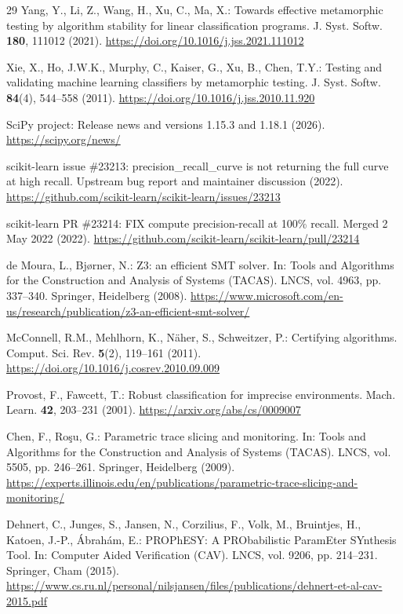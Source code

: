 \documentclass[11pt,a4paper]{article}
\theoremstyle{plain}
\theoremstyle{definition}
\theoremstyle{remark}
\begin{document}
\begin{thebibliography}{29}
Yang, Y., Li, Z., Wang, H., Xu, C., Ma, X.: Towards effective metamorphic testing by algorithm stability for linear classification programs. J. Syst. Softw. \textbf{180}, 111012 (2021). \url{https://doi.org/10.1016/j.jss.2021.111012}

Xie, X., Ho, J.W.K., Murphy, C., Kaiser, G., Xu, B., Chen, T.Y.: Testing and validating machine learning classifiers by metamorphic testing. J. Syst. Softw. \textbf{84}(4), 544--558 (2011). \url{https://doi.org/10.1016/j.jss.2010.11.920}

SciPy project: Release news and versions 1.15.3 and 1.18.1 (2026). \url{https://scipy.org/news/}

scikit-learn issue \#23213: precision\_recall\_curve is not returning the full curve at high recall. Upstream bug report and maintainer discussion (2022). \url{https://github.com/scikit-learn/scikit-learn/issues/23213}

scikit-learn PR \#23214: FIX compute precision-recall at 100\% recall. Merged 2 May 2022 (2022). \url{https://github.com/scikit-learn/scikit-learn/pull/23214}

de Moura, L., Bj{\o}rner, N.: Z3: an efficient SMT solver. In: Tools and Algorithms for the Construction and Analysis of Systems (TACAS). LNCS, vol. 4963, pp. 337--340. Springer, Heidelberg (2008). \url{https://www.microsoft.com/en-us/research/publication/z3-an-efficient-smt-solver/}

McConnell, R.M., Mehlhorn, K., N\"{a}her, S., Schweitzer, P.: Certifying algorithms. Comput. Sci. Rev. \textbf{5}(2), 119--161 (2011). \url{https://doi.org/10.1016/j.cosrev.2010.09.009}

Provost, F., Fawcett, T.: Robust classification for imprecise environments. Mach. Learn. \textbf{42}, 203--231 (2001). \url{https://arxiv.org/abs/cs/0009007}

Chen, F., Ro\c{s}u, G.: Parametric trace slicing and monitoring. In: Tools and Algorithms for the Construction and Analysis of Systems (TACAS). LNCS, vol. 5505, pp. 246--261. Springer, Heidelberg (2009). \url{https://experts.illinois.edu/en/publications/parametric-trace-slicing-and-monitoring/}

Dehnert, C., Junges, S., Jansen, N., Corzilius, F., Volk, M., Bruintjes, H., Katoen, J.-P., \'{A}brah\'{a}m, E.: PROPhESY: A PRObabilistic ParamEter SYnthesis Tool. In: Computer Aided Verification (CAV). LNCS, vol. 9206, pp. 214--231. Springer, Cham (2015). \url{https://www.cs.ru.nl/personal/nilsjansen/files/publications/dehnert-et-al-cav-2015.pdf}


\end{thebibliography}
\end{document}
